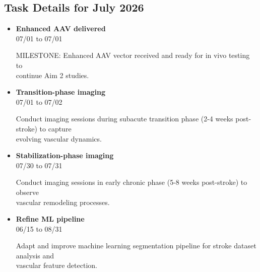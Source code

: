 \documentclass[landscape,a4paper]{article}
\begin{document}
\subsection{Task Details for July 2026}
\begin{itemize}[leftmargin=1cm, itemsep=0.8em]
    \item \textcolor{other}{\textbf{Enhanced AAV delivered}}\\[0.2em]
          \textcolor{black!70}{\small 07/01 to 07/01}
\\[0.3em]
          \begin{minipage}[t]{0.85\textwidth}
          \textcolor{black!80}{MILESTONE: Enhanced AAV vector received and ready for in vivo testing to\\[0.1em]
          continue Aim 2 studies.}
          \end{minipage}

    \item \textcolor{other}{\textbf{Transition-phase imaging}}\\[0.2em]
          \textcolor{black!70}{\small 07/01 to 07/02}
\\[0.3em]
          \begin{minipage}[t]{0.85\textwidth}
          \textcolor{black!80}{Conduct imaging sessions during subacute transition phase (2-4 weeks post-stroke) to capture\\[0.1em]
          evolving vascular dynamics.}
          \end{minipage}

    \item \textcolor{other}{\textbf{Stabilization-phase imaging}}\\[0.2em]
          \textcolor{black!70}{\small 07/30 to 07/31}
\\[0.3em]
          \begin{minipage}[t]{0.85\textwidth}
          \textcolor{black!80}{Conduct imaging sessions in early chronic phase (5-8 weeks post-stroke) to observe\\[0.1em]
          vascular remodeling processes.}
          \end{minipage}

    \item \textcolor{other}{\textbf{Refine ML pipeline}}\\[0.2em]
          \textcolor{black!70}{\small 06/15 to 08/31}
\\[0.3em]
          \begin{minipage}[t]{0.85\textwidth}
          \textcolor{black!80}{Adapt and improve machine learning segmentation pipeline for stroke dataset analysis and\\[0.1em]
          vascular feature detection.}
          \end{minipage}

\end{itemize}
\end{document}
